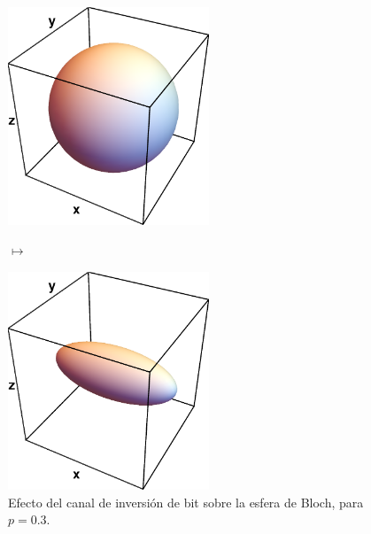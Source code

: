 \begin{figure}
\centering
\begin{minipage}{.4\textwidth}
    \centering
    \includegraphics[width=6cm]{images/bloch-ball}
\end{minipage}
$\longmapsto$
\begin{minipage}{0.4\textwidth}
    \centering
    \includegraphics[width=6cm]{images/bit-flip}
\end{minipage}
\caption{
Efecto del canal de inversión de bit sobre la esfera de Bloch, para $p=0.3$.}
\label{fig:bit-flip}
\end{figure}

